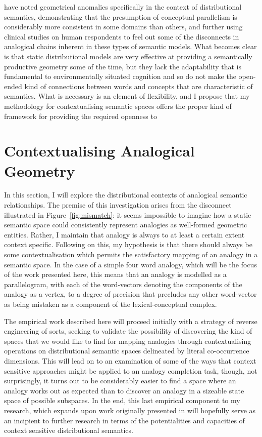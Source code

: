 \cite{ChenEA2017} have noted geometrical anomalies specifically in the context of distributional semantics, demonstrating that the presumption of conceptual parallelism is considerably more consistent in some domains than others, and further using clinical studies on human respondents to feel out some of the disconnects in analogical chains inherent in these types of semantic models.  What becomes clear is that static distributional models are very effective at providing a semantically productive geometry some of the time, but they lack the adaptability that is fundamental to environmentally situated cognition and so do not make the open-ended kind of connections between words and concepts that are characteristic of semantics.  What is necessary is an element of flexibility, and I propose that my methodology for contextualising semantic spaces offers the proper kind of framework for providing the required openness to 

\section{Contextualising Analogical Geometry}
In this section, I will explore the distributional contexts of analogical semantic relationships.  The premise of this investigation arises from the disconnect illustrated in Figure~\ref{fig:mismatch}: it seems impossible to imagine how a static semantic space could consistently represent analogies as well-formed geometric entities.  Rather, I maintain that analogy is always to at least a certain extent context specific.  Following on this, my hypothesis is that there should always be some contextualisation which permits the satisfactory mapping of an analogy in a semantic space.  In the case of a simple four word analogy, which will be the focus of the work presented here, this means that an analogy is modelled as a parallelogram, with each of the word-vectors denoting the components of the analogy as a vertex, to a degree of precision that precludes any other word-vector as being mistaken as a component of the lexical-conceptual complex.

The empirical work described here will proceed initially with a strategy of reverse engineering of sorts, seeking to validate the possibility of discovering the kind of spaces that we would like to find for mapping analogies through contextualising operations on distributional semantic spaces delineated by literal co-occurrence dimensions.  This will lead on to an examination of some of the ways that context sensitive approaches might be applied to an analogy completion task, though, not surprisingly, it turns out to be considerably easier to find a space where an analogy works out as expected than to discover an analogy in a sizeable state space of possible subspaces.  In the end, this last empirical component to my research, which expands upon work originally presented in \cite{McGregorEA2016} will hopefully serve as an incipient to further research in terms of the potentialities and capacities of context sensitive distributional semantics.


